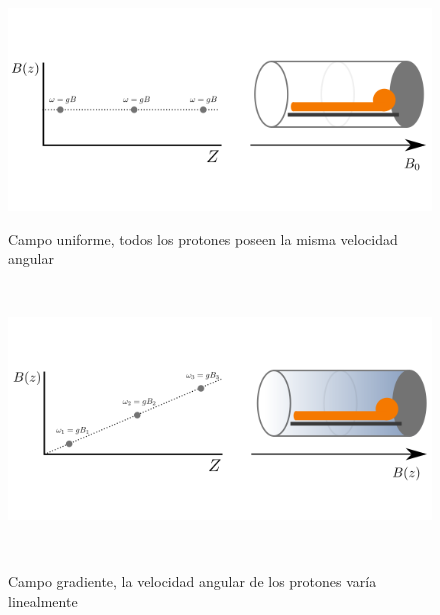 \begin{figure}[h!]
                                                                                                                        
\begin{minipage}[b]{0.49\textwidth}
    \includegraphics[width=\textwidth]{img/grad0.png}
    \caption{\small  Campo uniforme, todos los protones poseen la misma velocidad angular}
     \label{fig:unif}
\end{minipage} ~
\hfill
\begin{minipage}[b]{0.49\textwidth}
    \includegraphics[width=\textwidth]{img/grad1.png}
    \caption{\small Campo gradiente, la velocidad angular de los protones var\'ia linealmente }
    \label{fig:grad}
\end{minipage} ~

\end{figure}  

\vspace{0.1cm}

